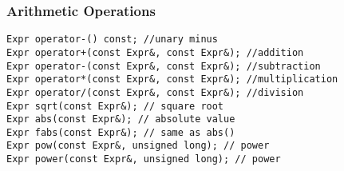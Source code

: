 
\subsubsection{Arithmetic Operations}
\begin{progb} {

\> \tt Expr operator-() const; //unary minus \\
\> \tt Expr operator+(const Expr\&, const Expr\&); //addition \\
\> \tt Expr operator-(const Expr\&, const Expr\&); //subtraction \\
\> \tt Expr operator*(const Expr\&, const Expr\&); //multiplication \\
\> \tt Expr operator/(const Expr\&, const Expr\&); //division \\
\> \tt Expr sqrt(const Expr\&); // square root \\
\> \tt Expr abs(const Expr\&); // absolute value \\
\> \tt Expr fabs(const Expr\&); // same as abs()  \\
\> \tt Expr pow(const Expr\&, unsigned long); // power \\
\> \tt Expr power(const Expr\&, unsigned long); // power \\
}\end{progb}


